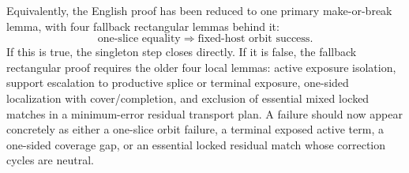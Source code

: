 \documentclass[11pt]{article}
\begin{document}
Equivalently, the English proof has been reduced to one primary make-or-break
lemma, with four fallback rectangular lemmas behind it:
\[
  \text{one-slice equality}\Rightarrow\text{fixed-host orbit success}.
\]
If this is true, the singleton step closes directly.  If it is false, the
fallback rectangular proof requires the older four local lemmas: active
exposure isolation, support escalation to productive splice or terminal
exposure, one-sided localization with cover/completion, and exclusion of
essential mixed locked matches in a minimum-error residual transport plan.  A
failure should now appear concretely as either a one-slice orbit failure, a
terminal exposed active term, a one-sided coverage gap, or an essential locked
residual match whose correction cycles are neutral.
\end{document}
